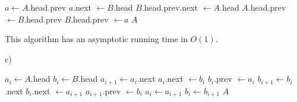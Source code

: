 \documentclass{article}
\begin{document}
\begin{algorithmic}[1]
        \State $a \gets A$.head.prev
        \State $a$.next $\gets B$.head
        \State $B$.head.prev.next $\gets A$.head
        \State $A$.head.prev $\gets B$.head.prev
        \State $B$.head.prev $\gets a$
        \State \Return $A$
    \EndFunction
\end{algorithmic}
This algorithm has an asymptotic running time in $O(1)$.

c)
\begin{algorithmic}[1]
        \State $a_i \gets A$.head
        \State $b_i \gets B$.head
            \State $a_{i+1} \gets a_i$.next
            \State $a_i$.next $\gets b_i$
            \State $b_i$.prev $\gets a_i$
            \State $b_{i+1} \gets b_i$.next
                \State $b_i$.next $\gets a_{i+1}$
                \State $a_{i+1}$.prev $\gets b_i$
                \EndIf
            \EndIf
            \State $a_i \gets a_{i+1}$
            \State $b_i \gets b_{i+1}$
        \EndWhile
        \State \Return $A$
    \EndFunction
\end{algorithmic}
\end{document}
